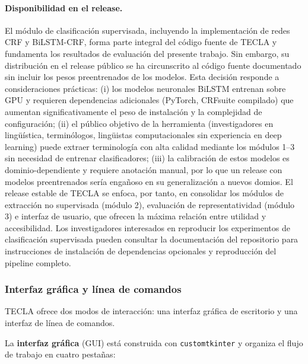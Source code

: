 \paragraph{Disponibilidad en el release.} El módulo de clasificación supervisada, incluyendo la implementación de redes CRF y BiLSTM-CRF, forma parte integral del código fuente de TECLA y fundamenta los resultados de evaluación del presente trabajo. Sin embargo, su distribución en el release público se ha circunscrito al código fuente documentado sin incluir los pesos preentrenados de los modelos. Esta decisión responde a consideraciones prácticas: (i) los modelos neuronales BiLSTM entrenan sobre GPU y requieren dependencias adicionales (PyTorch, CRFsuite compilado) que aumentan significativamente el peso de instalación y la complejidad de configuración; (ii) el público objetivo de la herramienta (investigadores en lingüística, terminólogos, lingüistas computacionales sin experiencia en deep learning) puede extraer terminología con alta calidad mediante los módulos 1--3 sin necesidad de entrenar clasificadores; (iii) la calibración de estos modelos es dominio-dependiente y requiere anotación manual, por lo que un release con modelos preentrenados sería engañoso en su generalización a nuevos domios. El release estable de TECLA se enfoca, por tanto, en consolidar los módulos de extracción no supervisada (módulo 2), evaluación de representatividad (módulo 3) e interfaz de usuario, que ofrecen la máxima relación entre utilidad y accesibilidad. Los investigadores interesados en reproducir los experimentos de clasificación supervisada pueden consultar la documentación del repositorio para instrucciones de instalación de dependencias opcionales y reproducción del pipeline completo.

\subsubsection*{Interfaz gráfica y línea de comandos}

TECLA ofrece dos modos de interacción: una interfaz gráfica de escritorio y una interfaz de línea de comandos.

La \textbf{interfaz gráfica} (GUI) está construida con \texttt{customtkinter} y organiza el flujo de trabajo en cuatro pestañas:

